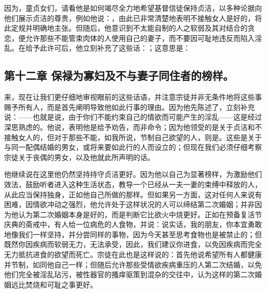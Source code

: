 因为，童贞女们，请看他是如何竭尽全力地希望基督信徒保持贞洁，以多种论据向他们展示贞洁的尊贵，例如他说：，由此已非常清楚地表明不接触女人是好的，将此定规并明确地主张。但随后，他意识到不太能自制的人之软弱及其对结合的贪恋，便允许那些不能管束肉体的人使用自己的妻子，而不要因可耻地违反而陷入淫乱。在给予此许可后，他立刻补充了这些话：；这意思是：\par


\subsection{第十二章 保禄为寡妇及不与妻子同住者的榜样。}

来，现在让我们更仔细地审视眼前的这些话语，并注意宗徒并非无条件地将这些事赐予所有人，而是首先阐明导致他如此行事的理由。因为他先陈述了，立刻补充说：——也就是说，由于你们不能约束自己的情欲而可能产生的淫乱——这是经过深思熟虑的。他说，表明他是给予劝告，而非命令；因为他领受的是关于贞洁和不接触女人的，但对于那些不能，如我所说，节制自己欲望的人，则是。这些是关于与同一配偶结婚的男女，或将来要如此行的人而设立的；但现在我们必须仔细考察宗徒关于丧偶的男女，以及他就此所声明的话。\par

他继续说在这里他仍然坚持持守贞洁更好。因为他以自己为显著榜样，为激励他们效法，鼓励听者进入这种生活状态，教导一个已经从一夫一妻的束缚中释放的人，从此应当保持独身，正如他自己所做的那样。但如果另一方面，这对任何人来说有困难，因情欲冲动之强烈，他允许处于这样状况的人可以缔结第二次婚姻；并非因为他认为第二次婚姻本身是好的，而是判断它比欲火中烧更好。正如在预备复活节庆典的斋戒中，有人给一位病危的人食物，并说：说实话，我的朋友，你本宜勇敢地像我们一样坚持，并分尝同样的事物，因为今天甚至思考食物也是被禁止的；但既然你因疾病而软弱无力，无法承受，因此，我们建议你进食，以免因疾病而完全无力抵抗进食的欲望而死亡。宗徒在此也是这样说的：首先他说希望所有人都健康并节制，如同他自己一样；但随后允许那些受情欲疾病重压的人第二次结婚，以免他们完全被淫乱玷污，被性器官的搔痒驱策到混杂的交往中，认为这样的第二次婚姻远比焚烧和可耻之事更好。\par

